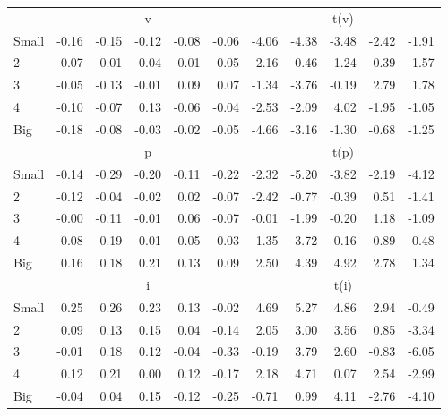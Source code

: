 \begin{table}[!ht]
\begin{tabular}{lrrrrrrrrrr}
  
     & \multicolumn{5}{c}{v} & \multicolumn{5}{c}{t(v)}   \\
     \cmidrule(r){2-6} \cmidrule(r){7-11} 
    Small  & -0.16  & -0.15  & -0.12  & -0.08  & -0.06  & -4.06  & -4.38  & -3.48  & -2.42  & -1.91   \\
    2  & -0.07  & -0.01  & -0.04  & -0.01  & -0.05  & -2.16  & -0.46  & -1.24  & -0.39  & -1.57   \\
    3  & -0.05  & -0.13  & -0.01  & 0.09  & 0.07  & -1.34  & -3.76  & -0.19  & 2.79  & 1.78   \\
    4  & -0.10  & -0.07  & 0.13  & -0.06  & -0.04  & -2.53  & -2.09  & 4.02  & -1.95  & -1.05   \\
    Big  & -0.18  & -0.08  & -0.03  & -0.02  & -0.05  & -4.66  & -3.16  & -1.30  & -0.68  & -1.25   \\
    
  
     & \multicolumn{5}{c}{p} & \multicolumn{5}{c}{t(p)}   \\
     \cmidrule(r){2-6} \cmidrule(r){7-11} 
    Small  & -0.14  & -0.29  & -0.20  & -0.11  & -0.22  & -2.32  & -5.20  & -3.82  & -2.19  & -4.12   \\
    2  & -0.12  & -0.04  & -0.02  & 0.02  & -0.07  & -2.42  & -0.77  & -0.39  & 0.51  & -1.41   \\
    3  & -0.00  & -0.11  & -0.01  & 0.06  & -0.07  & -0.01  & -1.99  & -0.20  & 1.18  & -1.09   \\
    4  & 0.08  & -0.19  & -0.01  & 0.05  & 0.03  & 1.35  & -3.72  & -0.16  & 0.89  & 0.48   \\
    Big  & 0.16  & 0.18  & 0.21  & 0.13  & 0.09  & 2.50  & 4.39  & 4.92  & 2.78  & 1.34   \\
    
  
     & \multicolumn{5}{c}{i} & \multicolumn{5}{c}{t(i)}   \\
     \cmidrule(r){2-6} \cmidrule(r){7-11} 
    Small  & 0.25  & 0.26  & 0.23  & 0.13  & -0.02  & 4.69  & 5.27  & 4.86  & 2.94  & -0.49   \\
    2  & 0.09  & 0.13  & 0.15  & 0.04  & -0.14  & 2.05  & 3.00  & 3.56  & 0.85  & -3.34   \\
    3  & -0.01  & 0.18  & 0.12  & -0.04  & -0.33  & -0.19  & 3.79  & 2.60  & -0.83  & -6.05   \\
    4  & 0.12  & 0.21  & 0.00  & 0.12  & -0.17  & 2.18  & 4.71  & 0.07  & 2.54  & -2.99   \\
    Big  & -0.04  & 0.04  & 0.15  & -0.12  & -0.25  & -0.71  & 0.99  & 4.11  & -2.76  & -4.10   \\
    
  
  \bottomrule
\end{tabular}
\label{tbl:25_Size_Acc_F16}
\end{table}